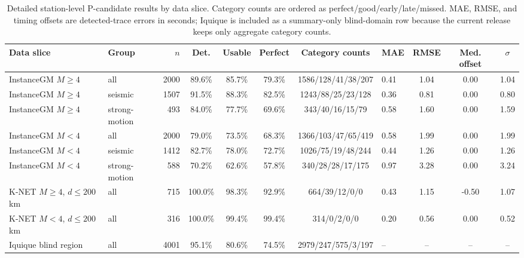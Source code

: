 \begin{table}[!t]
\centering
\caption{Detailed station-level P-candidate results by data slice. Category counts are ordered as perfect/good/early/late/missed. MAE, RMSE, and timing offsets are detected-trace errors in seconds; Iquique is included as a summary-only blind-domain row because the current release keeps only aggregate category counts.}
\label{tab:station_detailed}
{\tgrsdensetablesetup
\begin{tabular}{@{}llrcccclccc@{}}
\toprule
Data slice & Group & $n$ & Det. & Usable & Perfect & Category counts & MAE & RMSE & Med. offset & $\sigma$\\
\midrule
InstanceGM $M\geq4$ & all & 2000 & 89.6\% & 85.7\% & 79.3\% & 1586/128/41/38/207 & 0.41 & 1.04 & 0.00 & 1.04\\
InstanceGM $M\geq4$ & seismic & 1507 & 91.5\% & 88.3\% & 82.5\% & 1243/88/25/23/128 & 0.36 & 0.81 & 0.00 & 0.80\\
InstanceGM $M\geq4$ & strong-motion & 493 & 84.0\% & 77.7\% & 69.6\% & 343/40/16/15/79 & 0.58 & 1.60 & 0.00 & 1.59\\
InstanceGM $M<4$ & all & 2000 & 79.0\% & 73.5\% & 68.3\% & 1366/103/47/65/419 & 0.58 & 1.99 & 0.00 & 1.99\\
InstanceGM $M<4$ & seismic & 1412 & 82.7\% & 78.0\% & 72.7\% & 1026/75/19/48/244 & 0.44 & 1.26 & 0.00 & 1.26\\
InstanceGM $M<4$ & strong-motion & 588 & 70.2\% & 62.6\% & 57.8\% & 340/28/28/17/175 & 0.97 & 3.28 & 0.00 & 3.24\\
K-NET $M\geq4$, $d\leq200$ km & all & 715 & 100.0\% & 98.3\% & 92.9\% & 664/39/12/0/0 & 0.43 & 1.15 & -0.50 & 1.07\\
K-NET $M<4$, $d\leq200$ km & all & 316 & 100.0\% & 99.4\% & 99.4\% & 314/0/2/0/0 & 0.20 & 0.56 & 0.00 & 0.52\\
Iquique blind region & all & 4001 & 95.1\% & 80.6\% & 74.5\% & 2979/247/575/3/197 & -- & -- & -- & --\\
\bottomrule
\end{tabular}}
\end{table}
